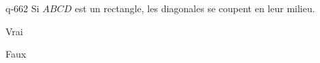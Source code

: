 \begin{truefalse}{q-662}
Si $ABCD$ est un rectangle, les diagonales se coupent en leur milieu.
\item* Vrai
\item Faux
\end{truefalse}

